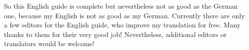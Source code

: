So this English guide is complete but nevertheless not as good as the German
one, because my English is not as good as my German. Currently there are only
a few editors for the English guide, who improve my translation for free. Many
thanks to them for their very good job! Nevertheless, additional editors or
translators would be welcome!

\endinput



